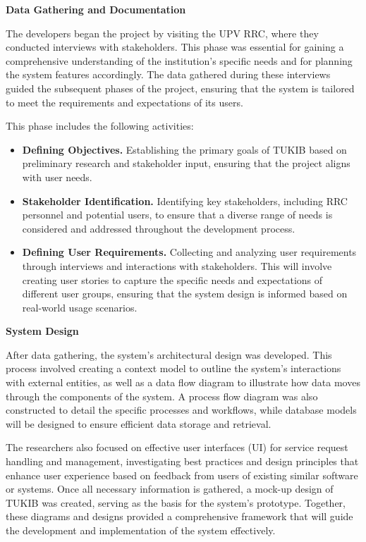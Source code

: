 \textbf{Data Gathering and Documentation}

The developers began the project by visiting the UPV RRC, where they conducted interviews with stakeholders. This phase was essential for gaining a comprehensive understanding of the institution's specific needs and for planning the system features accordingly. The data gathered during these interviews guided the subsequent phases of the project, ensuring that the system is tailored to meet the requirements and expectations of its users. 

This phase includes the following activities:

\begin{itemize}
	\item \textbf{Defining Objectives.} Establishing the primary goals of TUKIB based on preliminary research and stakeholder input, ensuring that the project aligns with user needs.
	\item \textbf{Stakeholder Identification.} Identifying key stakeholders, including RRC personnel and potential users, to ensure that a diverse range of needs is considered and addressed throughout the development process.
	\item \textbf{Defining User Requirements.} Collecting and analyzing user requirements through interviews and interactions with stakeholders. This will involve creating user stories to capture the specific needs and expectations of different user groups, ensuring that the system design is informed based on real-world usage scenarios.
\end{itemize}

\textbf{System Design}

After data gathering, the system's architectural design was developed. This process involved creating a context model to outline the system's interactions with external entities, as well as a data flow diagram to illustrate how data moves through the components of the system. A process flow diagram was also constructed to detail the specific processes and workflows, while database models will be designed to ensure efficient data storage and retrieval. 

The researchers also focused on effective user interfaces (UI) for service request handling and management, investigating best practices and design principles that enhance user experience based on feedback from users of existing similar software or systems. Once all necessary information is gathered, a mock-up design of TUKIB was created, serving as the basis for the system's prototype. Together, these diagrams and designs provided a comprehensive framework that will guide the development and implementation of the system effectively.\newline

